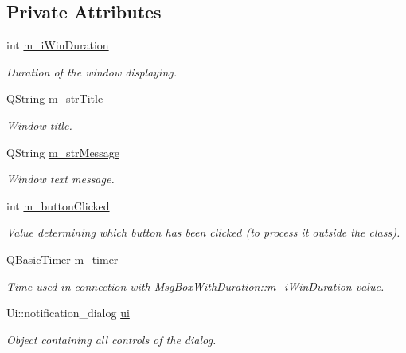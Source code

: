 \subsection*{Private Attributes}
\begin{DoxyCompactItemize}
\item 
int \hyperlink{class_msg_box_with_duration_afc0d11e89f2bd6e92b50d6ba54ffa8ae}{m\-\_\-i\-Win\-Duration}
\begin{DoxyCompactList}\small\item\em Duration of the window displaying. \end{DoxyCompactList}\item 
Q\-String \hyperlink{class_msg_box_with_duration_ad98c5584c1e572b4dfd2ce93bda0869f}{m\-\_\-str\-Title}
\begin{DoxyCompactList}\small\item\em Window title. \end{DoxyCompactList}\item 
Q\-String \hyperlink{class_msg_box_with_duration_a4d3008361bc8d16dfede02d194054431}{m\-\_\-str\-Message}
\begin{DoxyCompactList}\small\item\em Window text message. \end{DoxyCompactList}\item 
int \hyperlink{class_msg_box_with_duration_aa05c4b5b8f0615c52c1dee7c4d00c0ed}{m\-\_\-button\-Clicked}
\begin{DoxyCompactList}\small\item\em Value determining which button has been clicked (to process it outside the class). \end{DoxyCompactList}\item 
Q\-Basic\-Timer \hyperlink{class_msg_box_with_duration_a37d6effb60594f9c1a3bd8d640203cf5}{m\-\_\-timer}
\begin{DoxyCompactList}\small\item\em Time used in connection with \hyperlink{class_msg_box_with_duration_afc0d11e89f2bd6e92b50d6ba54ffa8ae}{Msg\-Box\-With\-Duration\-::m\-\_\-i\-Win\-Duration} value. \end{DoxyCompactList}\item 
Ui\-::notification\-\_\-dialog \hyperlink{class_msg_box_with_duration_af9d5df1430e9ad3390e7f353fc57f01d}{ui}
\begin{DoxyCompactList}\small\item\em Object containing all controls of the dialog. \end{DoxyCompactList}\end{DoxyCompactItemize}


